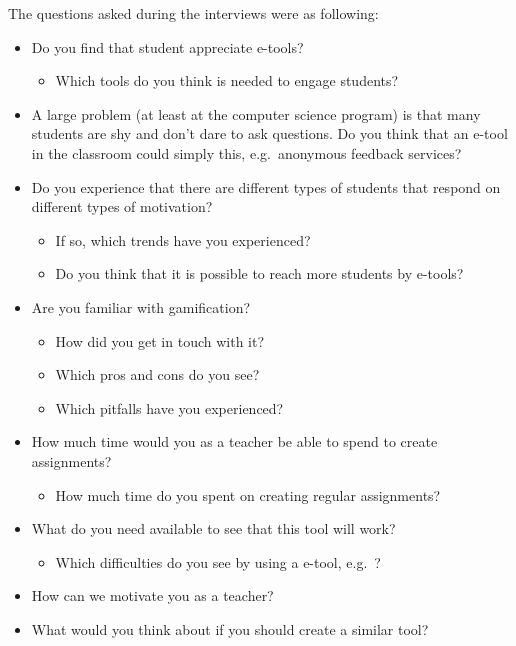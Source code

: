 The questions asked during the interviews were as following:

\begin{itemize}
 \item Do you find that student appreciate e-tools?
 \begin{itemize}
 \item Which tools do you think is needed to engage students?
 \end{itemize}
 
 \item A large problem (at least at the computer science program) is that many students are shy and don't dare to ask questions. Do you think that an e-tool in the classroom could simply this, e.g.\ anonymous feedback services? 
 
 \item Do you experience that there are different types of students that respond on different types of motivation?
 \begin{itemize}
 \item If so, which trends have you experienced?
 \item Do you think that it is possible to reach more students by e-tools?
 \end{itemize}
 
 \item Are you familiar with gamification?
 \begin{itemize}
 \item How did you get in touch with it?
 \item Which pros and cons do you see?
 \item Which pitfalls have you experienced?
 \end{itemize}
 
 \item How much time would you as a teacher be able to spend to create assignments?
 \begin{itemize}
 \item How much time do you spent on creating regular assignments?
 \end{itemize}
 
 \item What do you need available to see that this tool will work?
 \begin{itemize}
 \item Which difficulties do you see by using a e-tool, e.g.\ \techio{}?
 \end{itemize}
\item How can we motivate you as a teacher?
\item What would you think about if you should create a similar tool?

\end{itemize}

